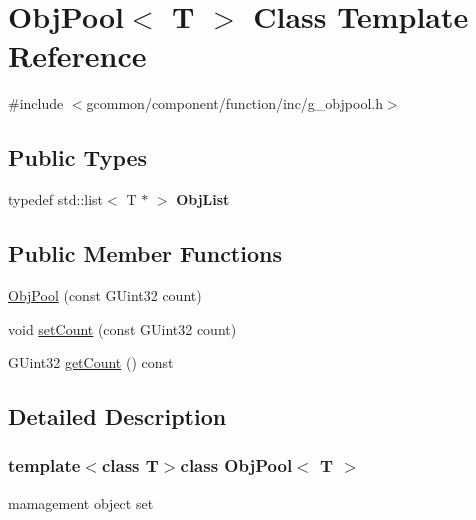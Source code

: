 \hypertarget{class_obj_pool}{\section{Obj\-Pool$<$ T $>$ Class Template Reference}
\label{class_obj_pool}
}


{\ttfamily \#include $<$gcommon/component/function/inc/g\-\_\-objpool.\-h$>$}

\subsection*{Public Types}
\begin{DoxyCompactItemize}
\item 
\hypertarget{class_obj_pool_a14ab448fcb58c1034e3be9edbc83944b}{typedef std\-::list$<$ T $\ast$ $>$ {\bfseries Obj\-List}}\label{class_obj_pool_a14ab448fcb58c1034e3be9edbc83944b}

\end{DoxyCompactItemize}
\subsection*{Public Member Functions}
\begin{DoxyCompactItemize}
\item 
\hyperlink{class_obj_pool_a948b87fdb2e1d9da7dc3fbe6cdad3eee}{Obj\-Pool} (const G\-Uint32 count)
\item 
void \hyperlink{class_obj_pool_a7a23340fe2e11f7b23d6fb4dae5cbef1}{set\-Count} (const G\-Uint32 count)
\item 
G\-Uint32 \hyperlink{class_obj_pool_a4038ce92db308312a7703748391d19ec}{get\-Count} () const 
\end{DoxyCompactItemize}


\subsection{Detailed Description}
\subsubsection*{template$<$class T$>$class Obj\-Pool$<$ T $>$}

mamagement object set 

